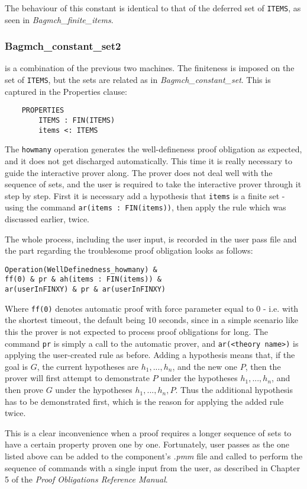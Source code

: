 \documentclass[11pt,journal]{IEEEtran}
\begin{document}
	The behaviour of this constant is identical to that of the deferred set of \texttt{ITEMS}, as seen in \emph{Bagmch\_finite\_items}.
	
	\subsubsection{Bagmch\_constant\_set2} is a combination of the previous two machines. The finiteness is imposed on the set of \texttt{ITEMS}, but the sets are related as in \emph{Bagmch\_constant\_set}. This is captured in the Properties clause:
	\begin{lstlisting}
	PROPERTIES
		ITEMS : FIN(ITEMS)
		items <: ITEMS 
	\end{lstlisting}
	The \texttt{howmany} operation generates the well-defineness proof obligation as expected, and it does not get discharged automatically. This time it is really necessary to guide the interactive prover along. The prover does not deal well with the sequence of sets, and the user is required to take the interactive prover through it step by step. First it is necessary add a hypothesis that \texttt{items} is a finite set - using the command \texttt{ar(items : FIN(items))}, then apply the rule which was discussed earlier, twice. 
	
	The whole process, including the user input, is recorded in the user pass file and the part regarding the troublesome proof obligation looks as follows:
	
	\begin{lstlisting}
Operation(WellDefinedness_howmany) & 
ff(0) & pr & ah(items : FIN(items)) &
ar(userInFINXY) & pr & ar(userInFINXY)
	\end{lstlisting}
	Where \texttt{ff(0)} denotes automatic proof with force parameter equal to 0 - i.e. with the shortest timeout, the default being 10 seconds, since in a simple scenario like this the prover is not expected to process proof obligations for long. The command \texttt{pr} is simply a call to the automatic prover, and \texttt{ar(<theory name>)} is applying the user-created rule as before. Adding a hypothesis means that, if the goal is $G$, the current hypotheses are $h_1, ..., h_n$, and the new one $P$, then the prover will first attempt to demonstrate $P$ under the hypotheses $h_1, ..., h_n$, and then prove $G$ under the hypotheses $h_1, ...,h_n, P$.\cite{PO reference}  Thus the additional hypothesis has to be demonstrated first, which is the reason for applying the added rule twice. 
	
	This is a clear inconvenience when a proof requires a longer sequence of sets to have a certain property proven one by one. Fortunately, user passes as the one listed above can be added to the component's \emph{.pmm} file and called to perform the sequence of commands with a single input from the user, as described in Chapter 5 of the \emph{Proof Obligations Reference Manual}.
	
\end{document}

